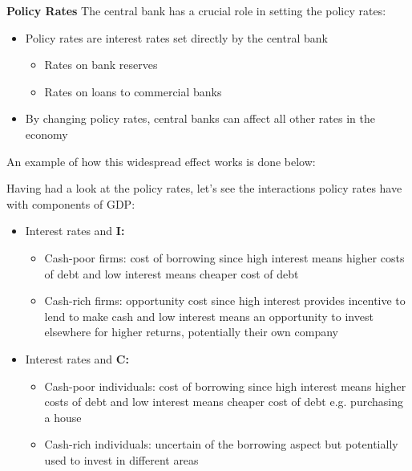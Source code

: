 \documentclass[12pt, letterpaper]{article}
\begin{document}
\textbf{Policy Rates}
The central bank has a crucial role in setting the policy rates:
\begin{itemize}
	\item Policy rates are interest rates set directly by the central bank
		\begin{itemize}
			\item Rates on bank reserves
			\item Rates on loans to commercial banks
		\end{itemize}
	\item By changing policy rates, central banks can affect all other rates in the economy
\end{itemize}
An example of how this widespread effect works is done below:
\begin{center}
\noindent{}
\end{center}
Having had a look at the policy rates, let's see the interactions policy rates have with components of GDP:
\begin{itemize}
	\item Interest rates and \textbf{I:}
		\begin{itemize}
			\item Cash-poor firms: cost of borrowing since high interest means higher costs of debt and low interest means cheaper cost of debt
			\item Cash-rich firms: opportunity cost since high interest provides incentive to lend to make cash and low interest means an opportunity to invest elsewhere for higher returns, potentially their own company
		\end{itemize}
	\item Interest rates and \textbf{C:}
		\begin{itemize}
			\item Cash-poor individuals: cost of borrowing since high interest means higher costs of debt and low interest means cheaper cost of debt e.g. purchasing a house
			\item Cash-rich individuals: uncertain of the borrowing aspect but potentially used to invest in different areas
		\end{itemize}
\end{itemize}
\end{document}
